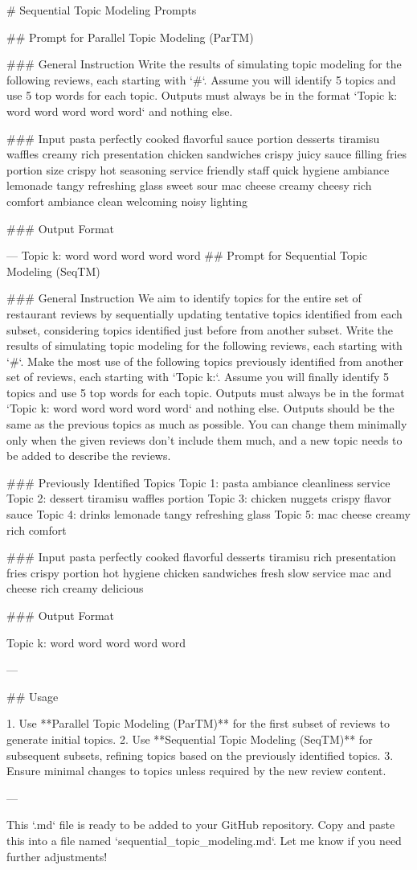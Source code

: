 # Sequential Topic Modeling Prompts

## Prompt for Parallel Topic Modeling (ParTM)

### General Instruction
Write the results of simulating topic modeling for the following reviews, each starting with `#`. Assume you will identify 5 topics and use 5 top words for each topic. Outputs must always be in the format `Topic k: word word word word word` and nothing else.

### Input
pasta perfectly cooked flavorful sauce portion
desserts tiramisu waffles creamy rich presentation
chicken sandwiches crispy juicy sauce filling
fries portion size crispy hot seasoning
service friendly staff quick hygiene ambiance
lemonade tangy refreshing glass sweet sour
mac cheese creamy cheesy rich comfort
ambiance clean welcoming noisy lighting

### Output Format

---
Topic k: word word word word word
## Prompt for Sequential Topic Modeling (SeqTM)

### General Instruction
We aim to identify topics for the entire set of restaurant reviews by sequentially updating tentative topics identified from each subset, considering topics identified just before from another subset. Write the results of simulating topic modeling for the following reviews, each starting with `#`. Make the most use of the following topics previously identified from another set of reviews, each starting with `Topic k:`. Assume you will finally identify 5 topics and use 5 top words for each topic. Outputs must always be in the format `Topic k: word word word word word` and nothing else. Outputs should be the same as the previous topics as much as possible. You can change them minimally only when the given reviews don’t include them much, and a new topic needs to be added to describe the reviews.

### Previously Identified Topics
Topic 1: pasta ambiance cleanliness service Topic 2: dessert tiramisu waffles portion Topic 3: chicken nuggets crispy flavor sauce Topic 4: drinks lemonade tangy refreshing glass Topic 5: mac cheese creamy rich comfort

### Input
pasta perfectly cooked flavorful
desserts tiramisu rich presentation
fries crispy portion hot hygiene
chicken sandwiches fresh slow service
mac and cheese rich creamy delicious

### Output Format

Topic k: word word word word word

---

## Usage

1. Use **Parallel Topic Modeling (ParTM)** for the first subset of reviews to generate initial topics.
2. Use **Sequential Topic Modeling (SeqTM)** for subsequent subsets, refining topics based on the previously identified topics.
3. Ensure minimal changes to topics unless required by the new review content.

---

This `.md` file is ready to be added to your GitHub repository. Copy and paste this into a file named `sequential_topic_modeling.md`. Let me know if you need further adjustments!



